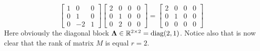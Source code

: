 \begin{example}
\begin{equation}
				\begin{bmatrix}
					1 & 0  & 0 \\
					0 & 1  & 0 \\
					0 & -2 & 1
				\end{bmatrix}
				\begin{bmatrix}
					2 & 0 & 0 & 0 \\
					0 & 1 & 0 & 0 \\
					0 & 2 & 0 & 0 
				\end{bmatrix}
				= 
				\begin{bmatrix}
					2 & 0 & 0 & 0 \\
					0 & 1 & 0 & 0 \\
					0 & 0 & 0 & 0 
				\end{bmatrix}
			\end{equation}
			Here obviously the diagonal block $\bm{\Lambda}\in\mathbb{R}^{2\times 2} = \textnormal{diag}(2,1)$. Notice also that is now clear that the rank of matrix $M$ is equal $r = 2$.
		\end{example}
